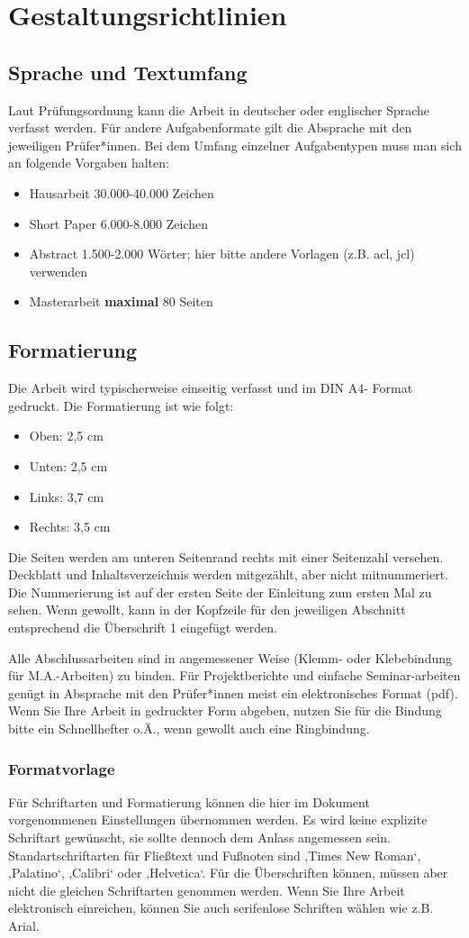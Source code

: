 \section{Gestaltungsrichtlinien}
\subsection{Sprache und Textumfang}
Laut Prüfungsordnung kann die Arbeit in deutscher oder englischer Sprache verfasst werden. Für andere Aufgabenformate gilt die Absprache mit den jeweiligen Prüfer*innen. Bei dem Umfang einzelner Aufgabentypen muss man sich an folgende Vorgaben halten:
\begin{itemize}
    \item Hausarbeit 30.000-40.000 Zeichen
    \item Short Paper 6.000-8.000 Zeichen
    \item Abstract 1.500-2.000 Wörter; hier bitte andere Vorlagen (z.B. acl, jcl) verwenden
    \item Masterarbeit \textbf{maximal} 80 Seiten
\end{itemize}
\subsection{Formatierung}
Die Arbeit wird typischerweise einseitig verfasst und im DIN A4- Format gedruckt. Die Formatierung ist wie folgt:
\begin{itemize}
    \item Oben: 2,5 cm
    \item Unten: 2,5 cm
    \item Links: 3,7 cm
    \item Rechts: 3,5 cm
\end{itemize}
Die Seiten werden am unteren Seitenrand rechts mit einer Seitenzahl versehen. Deckblatt und Inhaltsverzeichnis werden mitgezählt, aber nicht mitnummeriert. Die Nummerierung ist auf der ersten Seite der Einleitung zum ersten Mal zu sehen. Wenn gewollt, kann in der Kopfzeile für den jeweiligen Abschnitt entsprechend die Überschrift 1 eingefügt werden.

Alle Abschlussarbeiten sind in angemessener Weise (Klemm- oder Klebebindung für M.A.-Arbeiten) zu binden. Für Projektberichte und einfache Seminar-arbeiten genügt in Absprache mit den Prüfer*innen meist ein elektronisches Format (pdf). Wenn Sie Ihre Arbeit in gedruckter Form abgeben, nutzen Sie für die Bindung bitte ein Schnellhefter o.Ä., wenn gewollt auch eine Ringbindung. 
\subsubsection{Formatvorlage}
Für Schriftarten und Formatierung können die hier im Dokument vorgenommenen Einstellungen übernommen werden. Es wird keine explizite Schriftart gewünscht, sie sollte dennoch dem Anlass angemessen sein. Standartschriftarten für Fließtext und Fußnoten sind ‚Times New Roman‘, ‚Palatino‘, ‚Calibri‘ oder ‚Helvetica‘. Für die Überschriften können, müssen aber nicht die gleichen Schriftarten genommen werden. Wenn Sie Ihre Arbeit elektronisch einreichen, können Sie auch serifenlose Schriften wählen wie z.B. Arial.

